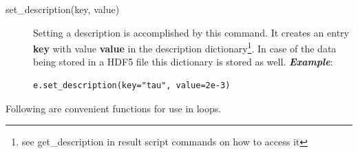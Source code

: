 \documentclass[12pt, a4paper, BCOR10mm, twoside, titlepage, headinclude]{scrbook}
\begin{document}
\begin{description}

\item[set\_description(key, value)]
Setting a description is accomplished by this command. It creates an entry  \textbf{key} with value \textbf{value} in the description dictionary\footnote{see get\_description in result script commands on how to access it}. In case of the data being stored in a \textsf{HDF5} file this dictionary is stored as well. 
\newline
\emph{\textbf{Example}}:
\begin{lstlisting}
e.set_description(key="tau", value=2e-3)
\end{lstlisting}
\end{description}
Following are convenient functions for use in loops.
\end{document}
